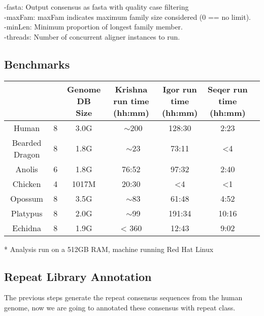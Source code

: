 \documentclass[12pt]{report}
\begin{document}
-fasta: Output consensus as fasta with quality case filtering\\
-maxFam: maxFam indicates maximum family size considered (0 == no limit).\\
-minLen: Minimum proportion of longest family member.\\
-threads: Number of concurrent aligner instances to run.


\subsection*{Benchmarks}

\footnotesize  %
\setlength\tabcolsep{1.5pt}
\begin{center}
	\begin{tabular}{|c|c|c|c|c|c|c|}
		\hline
		\thead{Genome}	&	\thead{ Krishna Threads }	&	\thead{Genome DB \\ Size}	& \thead{Krishna run time \\ (hh:mm)}	&	\thead{Igor run time \\ (hh:mm)}	&	\thead{Seqer run time \\ (hh:mm)}  \\
		\hline
		Human	&	8	&	3.0G	&	~$\sim$200	&	128:30	&	2:23 \\
		\hline 
		Bearded Dragon	&	8	&	1.8G	&	~$\sim$23	&	73:11	&	{<}4 \\
		\hline
		Anolis	& 6	& 1.8G	& 76:52	&	97:32	& 2:40	\\
		\hline
		Chicken	&	4	&	1017M	&	20:30	&	{<}4 & {<}1 \\
		\hline
		Opossum	&	8	&	3.5G	&	~$\sim$83	&	61:48	&	4:52 \\
		\hline
		Platypus	&	8	&	2.0G	&	~$\sim$99	&	191:34	&	10:16 \\
		\hline
		Echidna	&	8	&	1.9G	&	{<} 360	&	12:43	&	9:02 \\
		\hline
	\end{tabular}
\end{center}

* Analysis run on a 512GB RAM, machine running Red Hat Linux




\subsection*{Repeat Library Annotation}
The previous steps generate the repeat consensus sequences from the human genome, now we are going to annotated these consensus with repeat class.
\end{document}
